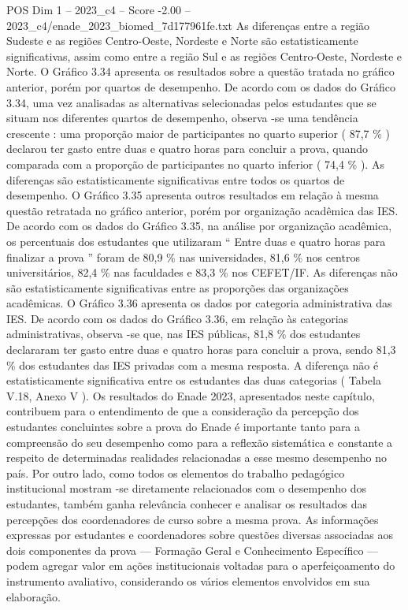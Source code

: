\begin{textsample}{POS Dim 1 – 2023\_c4 – Score -2.00 – 2023\_c4/enade\_2023\_biomed\_7d177961fe.txt}
As diferenças entre a região Sudeste e as regiões Centro-Oeste, Nordeste e Norte são estatisticamente significativas, assim como entre a região Sul e as regiões Centro-Oeste, Nordeste e Norte.
O Gráfico 3.34 apresenta os resultados sobre a questão tratada no gráfico anterior, porém por quartos de desempenho.
De acordo com os dados do Gráfico 3.34, uma vez analisadas as alternativas selecionadas pelos estudantes que se situam nos diferentes quartos de desempenho, observa -se uma tendência crescente : uma proporção maior de participantes no quarto superior ( 87,7 \% ) declarou ter gasto entre duas e quatro horas para concluir a prova, quando comparada com a proporção de participantes no quarto inferior ( 74,4 \% ).
As diferenças são estatisticamente significativas entre todos os quartos de desempenho.
O Gráfico 3.35 apresenta outros resultados em relação à mesma questão retratada no gráfico anterior, porém por organização acadêmica das IES.
De acordo com os dados do Gráfico 3.35, na análise por organização acadêmica, os percentuais dos estudantes que utilizaram “ Entre duas e quatro horas para finalizar a prova ” foram de 80,9 \% nas universidades, 81,6 \% nos centros universitários, 82,4 \% nas faculdades e 83,3 \% nos CEFET/IF.
As diferenças não são estatisticamente significativas entre as proporções das organizações acadêmicas.
O Gráfico 3.36 apresenta os dados por categoria administrativa das IES.
De acordo com os dados do Gráfico 3.36, em relação às categorias administrativas, observa -se que, nas IES públicas, 81,8 \% dos estudantes declararam ter gasto entre duas e quatro horas para concluir a prova, sendo 81,3 \% dos estudantes das IES privadas com a mesma resposta.
A diferença não é estatisticamente significativa entre os estudantes das duas categorias ( Tabela V.18, Anexo V ).
Os resultados do Enade 2023, apresentados neste capítulo, contribuem para o entendimento de que a consideração da percepção dos estudantes concluintes sobre a prova do Enade é importante tanto para a compreensão do seu desempenho como para a reflexão sistemática e constante a respeito de determinadas realidades relacionadas a esse mesmo desempenho no país.
Por outro lado, como todos os elementos do trabalho pedagógico institucional mostram -se diretamente relacionados com o desempenho dos estudantes, também ganha relevância conhecer e analisar os resultados das percepções dos coordenadores de curso sobre a mesma prova.
As informações expressas por estudantes e coordenadores sobre questões diversas associadas aos dois componentes da prova — Formação Geral e Conhecimento Específico — podem agregar valor em ações institucionais voltadas para o aperfeiçoamento do instrumento avaliativo, considerando os vários elementos envolvidos em sua elaboração.

\end{textsample}

